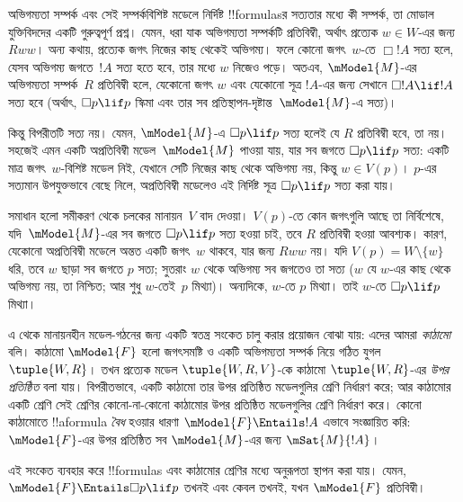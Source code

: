 \documentclass[../../../include/open-logic-section]{subfiles}
\begin{document}


অভিগম্যতা সম্পর্ক এবং সেই সম্পর্কবিশিষ্ট মডেলে নির্দিষ্ট !!{formula}sর সত্যতার মধ্যে কী সম্পর্ক, তা মোডাল যুক্তিবিদদের একটি গুরুত্বপূর্ণ প্রশ্ন। যেমন, ধরা যাক অভিগম্যতা সম্পর্কটি প্রতিবিম্বী, অর্থাৎ প্রত্যেক $w
\in W$-এর জন্য $Rww$। অন্য কথায়, প্রত্যেক জগৎ নিজের কাছ থেকেই অভিগম্য। ফলে কোনো জগৎ~$w$-তে $\Box !A$ সত্য হলে, যেসব অভিগম্য জগতে~$!A$ সত্য হতে হবে, তার মধ্যে $w$
নিজেও পড়ে। অতএব, $\mModel{M}$-এর অভিগম্যতা সম্পর্ক~$R$ প্রতিবিম্বী হলে, যেকোনো জগৎ $w$ এবং যেকোনো সূত্র $!A$-এর জন্য সেখানে $\Box !A
\lif !A$ সত্য হবে (অর্থাৎ, $\Box p \lif
p$ স্কিমা এবং তার সব প্রতিস্থাপন-দৃষ্টান্ত~$\mModel{M}$-এ সত্য)।

কিন্তু বিপরীতটি সত্য নয়। যেমন, $\mModel{M}$-এ $\Box p \lif p$ সত্য হলেই যে $R$ প্রতিবিম্বী হবে, তা নয়। সহজেই এমন একটি অপ্রতিবিম্বী মডেল~$\mModel{M}$ পাওয়া যায়, যার সব জগতে $\Box p \lif
p$ সত্য: একটি মাত্র জগৎ~$w$-বিশিষ্ট মডেল নিই, যেখানে সেটি নিজের কাছ থেকে অভিগম্য নয়, কিন্তু $w \in V(p)$। $p$-এর সত্যমান উপযুক্তভাবে বেছে নিলে, অপ্রতিবিম্বী মডেলেও এই নির্দিষ্ট সূত্র $\Box p \lif p$ সত্য করা যায়।

সমাধান হলো সমীকরণ থেকে চলকের মানায়ন~$V$ বাদ দেওয়া। $V(p)$-তে কোন জগৎগুলি আছে তা নির্বিশেষে, যদি~$\mModel{M}$-এর সব জগতে $\Box p \lif p$ সত্য হওয়া চাই, তবে $R$ প্রতিবিম্বী হওয়া আবশ্যক। কারণ, যেকোনো অপ্রতিবিম্বী মডেলে অন্তত একটি জগৎ~$w$ থাকবে, যার জন্য $Rww$ নয়। যদি $V(p) =
W \setminus \{w\}$ ধরি, তবে $w$ ছাড়া সব জগতে $p$ সত্য; সুতরাং $w$ থেকে অভিগম্য সব জগতেও তা সত্য ($w$ যে $w$-এর কাছ থেকে অভিগম্য নয়, তা নিশ্চিত; আর শুধু $w$-তেই~$p$ মিথ্যা)। অন্যদিকে, $w$-তে $p$ মিথ্যা। তাই $w$-তে $\Box
p \lif p$ মিথ্যা।

এ থেকে মানায়নহীন মডেল-গঠনের জন্য একটি স্বতন্ত্র সংকেত চালু করার প্রয়োজন বোঝা যায়: এদের আমরা \emph{কাঠামো} বলি। কাঠামো $\mModel{F}$ হলো জগৎসমষ্টি ও একটি অভিগম্যতা সম্পর্ক নিয়ে গঠিত যুগল $\tuple{W, R}$। তখন প্রত্যেক মডেল $\tuple{W, R, V}$-কে কাঠামো $\tuple{W, R}$-এর \emph{উপর প্রতিষ্ঠিত} বলা যায়। বিপরীতভাবে, একটি কাঠামো তার উপর প্রতিষ্ঠিত মডেলগুলির শ্রেণি নির্ধারণ করে; আর কাঠামোর একটি শ্রেণি সেই শ্রেণির কোনো-না-কোনো কাঠামোর উপর প্রতিষ্ঠিত মডেলগুলির শ্রেণি নির্ধারণ করে। কোনো কাঠামোতে !!a{formula} \emph{বৈধ} হওয়ার ধারণা $\mModel{F} \Entails !A$ এভাবে সংজ্ঞায়িত করি: $\mModel{F}$-এর উপর প্রতিষ্ঠিত সব $\mModel{M}$-এর জন্য $\mSat{M}{!A}$।

এই সংকেত ব্যবহার করে !!{formula}s এবং কাঠামোর শ্রেণির মধ্যে অনুরূপতা স্থাপন করা যায়। যেমন, $\mModel{F} \Entails \Box p \lif p$
তখনই এবং কেবল তখনই, যখন $\mModel{F}$ প্রতিবিম্বী।
\end{document}
